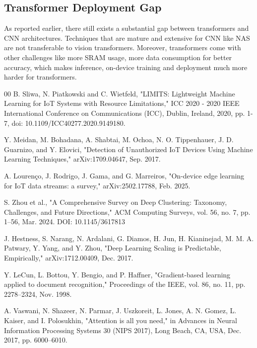 \documentclass[conference]{IEEEtran}
\begin{document}
	\subsection{Transformer Deployment Gap}
	As reported earlier, there still exists a substantial gap between transformers and CNN architectures. Techniques that are mature and extensive for CNN like NAS are not transferable to vision transformers. Moreover, transformers come with other challenges like more SRAM usage, more data consumption for better accuracy, which makes inference, on-device training and deployment much more harder for transformers.
	


	\begin{thebibliography}{00}
		B. Sliwa, N. Piatkowski and C. Wietfeld, "LIMITS: Lightweight Machine Learning for IoT Systems with Resource Limitations," ICC 2020 - 2020 IEEE International Conference on Communications (ICC), Dublin, Ireland, 2020, pp. 1-7, doi: 10.1109/ICC40277.2020.9149180.
	
		Y. Meidan, M. Bohadana, A. Shabtai, M. Ochoa, N. O. Tippenhauer, J. D. Guarnizo, and Y. Elovici, "Detection of Unauthorized IoT Devices Using Machine Learning Techniques," arXiv:1709.04647, Sep. 2017.
	
		A. Lourenço, J. Rodrigo, J. Gama, and G. Marreiros, "On-device edge learning for IoT data streams: a survey," arXiv:2502.17788, Feb. 2025.
		
		S. Zhou et al., "A Comprehensive Survey on Deep Clustering: Taxonomy, Challenges, and Future Directions," ACM Computing Surveys, vol. 56, no. 7, pp. 1–56, Mar. 2024. DOI: 10.1145/3617813
		
		J. Hestness, S. Narang, N. Ardalani, G. Diamos, H. Jun, H. Kianinejad, M. M. A. Patwary, Y. Yang, and Y. Zhou, "Deep Learning Scaling is Predictable, Empirically," arXiv:1712.00409, Dec. 2017.
		
		Y. LeCun, L. Bottou, Y. Bengio, and P. Haffner, "Gradient-based learning applied to document recognition," Proceedings of the IEEE, vol. 86, no. 11, pp. 2278–2324, Nov. 1998.
		
		A. Vaswani, N. Shazeer, N. Parmar, J. Uszkoreit, L. Jones, A. N. Gomez, L. Kaiser, and I. Polosukhin, "Attention is all you need," in Advances in Neural Information Processing Systems 30 (NIPS 2017), Long Beach, CA, USA, Dec. 2017, pp. 6000–6010.
		

\end{thebibliography}
\end{document}
